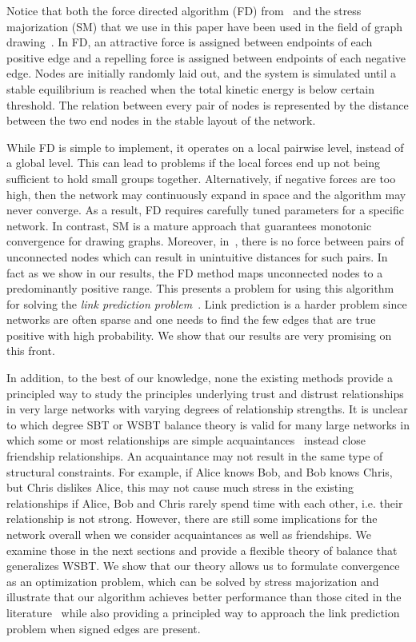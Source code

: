 Notice that both the force directed algorithm (FD)
from~\cite{golbeck:distrust2011} and the stress majorization (SM) that
we use in this paper have been used in the field of graph
drawing~\cite{Gansner:05}. In FD, an attractive force is assigned
between endpoints of each positive edge and a repelling force is
assigned between endpoints of each negative edge. Nodes are initially
randomly laid out, and the system is simulated until a stable
equilibrium is reached when the total kinetic energy is below certain
threshold. The relation between every pair of nodes is represented by
the distance between the two end nodes in the stable layout of the
network.

While FD is simple to implement, it operates on a local pairwise
level, instead of a global level. This can lead to problems if the
local forces end up not being sufficient to hold small groups
together. Alternatively, if negative forces are too high, then the
network may continuously expand in space and the algorithm may never
converge. As a result, FD requires carefully tuned
parameters for a specific network.  In contrast, SM is a
mature approach that guarantees monotonic convergence for drawing
graphs. Moreover, in~\cite{golbeck:distrust2011}, there is no force
between pairs of unconnected nodes which can result in unintuitive
distances for such pairs. In fact as we show in our results, the FD
method maps unconnected nodes to a predominantly positive range. This
presents a problem for using this algorithm for solving the
{\it link prediction problem}~\cite{Kleinberg:03}. Link prediction is
a harder problem since networks are often sparse and one needs to find
the few edges that are true positive with high
probability. We show that our results are very promising on this
front.

In addition, to the best of our knowledge, none the existing methods
provide a principled way to study the principles underlying trust and
distrust relationships in very large networks with varying degrees of
relationship strengths. It is unclear to which degree SBT or WSBT
balance theory is valid for many large networks in which some or most
relationships are simple acquaintances~\cite{Granovetter:1973} instead
close friendship relationships. An acquaintance may not result in the
same type of structural constraints. For example, if Alice knows Bob,
and Bob knows Chris, but Chris dislikes Alice, this may not cause
much stress in the existing relationships if Alice, Bob and Chris
rarely spend time with each other, i.e. their relationship is not
strong. However, there are still some implications for the network
overall when we consider acquaintances as well as friendships. We
examine those in the next sections and provide a flexible theory of
balance that generalizes WSBT. We show that our theory allows us to
formulate convergence as an optimization problem, which can be solved
by stress majorization and illustrate that our algorithm achieves
better performance than those cited in the
literature~\cite{golbeck:distrust2011} while also providing a
principled way to approach the link prediction problem when signed
edges are present.

